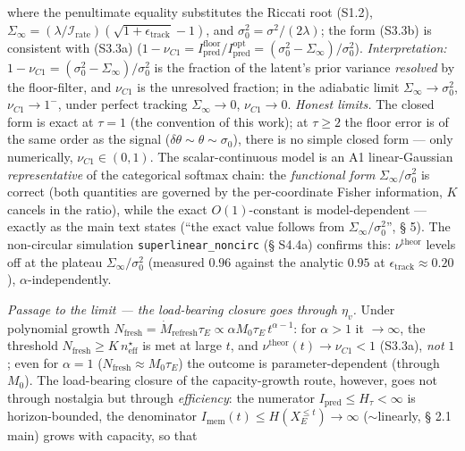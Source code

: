 \documentclass[12pt]{iopart}
\begin{document}
where the penultimate equality substitutes the Riccati root (S1.2), \(\Sigma_\infty = (\lambda/\mathcal I_{\text{rate}})(\sqrt{1+\epsilon_{\text{track}}}-1)\), and \(\sigma_0^2 = \sigma^2/(2\lambda)\); the form (S3.3b) is consistent with (S3.3a) (\(1-\nu_{C1} = I_{\text{pred}}^{\text{floor}}/I_{\text{pred}}^{\text{opt}} = (\sigma_0^2-\Sigma_\infty)/\sigma_0^2\)). \emph{Interpretation:} \(1-\nu_{C1} = (\sigma_0^2-\Sigma_\infty)/\sigma_0^2\) is the fraction of the latent's prior variance \emph{resolved} by the floor-filter, and \(\nu_{C1}\) is the unresolved fraction; in the adiabatic limit \(\Sigma_\infty\to\sigma_0^2\), \(\nu_{C1}\to1^-\), under perfect tracking \(\Sigma_\infty\to0\), \(\nu_{C1}\to0\). \emph{Honest limits.} The closed form is exact at \(\tau = 1\) (the convention of this work); at \(\tau\ge2\) the floor error is of the same order as the signal (\(\delta\theta\sim\theta\sim\sigma_0\)), there is no simple closed form --- only numerically, \(\nu_{C1}\in(0,1)\). The scalar-continuous model is an A1 linear-Gaussian \emph{representative} of the categorical softmax chain: the \emph{functional form} \(\Sigma_\infty/\sigma_0^2\) is correct (both quantities are governed by the per-coordinate Fisher information, \(K\) cancels in the ratio), while the exact \(O(1)\)-constant is model-dependent --- exactly as the main text states (``the exact value follows from \(\Sigma_\infty/\sigma_0^2\)'', § 5). The non-circular simulation \texttt{superlinear\_noncirc} (§ S4.4a) confirms this: \(\nu^{\text{theor}}\) levels off at the plateau \(\Sigma_\infty/\sigma_0^2\) (measured \(0.96\) against the analytic \(0.95\) at \(\epsilon_{\text{track}} \approx 0.20\)), \(\alpha\)-independently.



\emph{Passage to the limit --- the load-bearing closure goes through \(\eta_v\).} Under polynomial growth \(N_{\text{fresh}} = \dot M_{\text{refresh}}\tau_E \propto \alpha M_0\tau_E\,t^{\alpha-1}\): for \(\alpha > 1\) it \(\to \infty\), the threshold \(N_{\text{fresh}} \ge K\,n_{\text{eff}}^\star\) is met at large \(t\), and \(\nu^{\text{theor}}(t) \to \nu_{C1} < 1\) (S3.3a), \emph{not} \(1\); even for \(\alpha = 1\) (\(N_{\text{fresh}} \approx M_0\tau_E\)) the outcome is parameter-dependent (through \(M_0\)). The load-bearing closure of the capacity-growth route, however, goes not through nostalgia but through \emph{efficiency}: the numerator \(I_{\text{pred}} \le H_\tau < \infty\) is horizon-bounded, the denominator \(I_{\text{mem}}(t) \le H(X_E^{\le t}) \to \infty\) (\(\sim\)linearly, § 2.1 main) grows with capacity, so that
\end{document}
